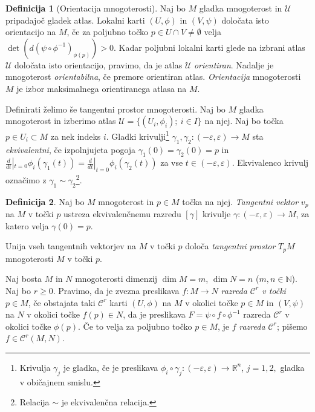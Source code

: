 \documentclass[12pt,a4paper,twoside]{article}
\theoremstyle{definition} %
\newtheorem{definicija}{Definicija}[section]
\theoremstyle{plain} %
\numberwithin{equation}{section}  %
\newcommand{\N}{\mathbb N}
\begin{document}
\begin{definicija}[Orientacija mnogoterosti]
Naj bo $M$ gladka mnogoterost in $\mathcal{U}$ pripadajoč gladek atlas. Lokalni karti $(U, \phi)$ in $(V, \psi)$ določata isto orientacijo na $M$, če za poljubno točko $p \in U \cap V \neq \emptyset$ velja $\det (d(\psi \circ \phi ^{-1})_{\phi (p)}) > 0.$ Kadar poljubni lokalni karti glede na izbrani atlas $\mathcal{U}$ določata isto orientacijo, pravimo, da je atlas $\mathcal{U}$ \emph{orientiran}. Nadalje je mnogoterost \emph{orientabilna}, če premore orientiran atlas. \emph{Orientacija} mnogoterosti $M$ je izbor maksimalnega orientiranega atlasa na $M$.
\end{definicija}

Definirati želimo še tangentni prostor mnogoterosti. Naj bo $M$ gladka mnogoterost in izberimo atlas $\mathcal{U} = \{ (U_{i}, \phi_{i}) ; \ i \in I \}$ na njej. Naj bo točka $p \in U_{i} \subset M$ za nek indeks $i$.  Gladki krivulji\footnote{Krivulja $\gamma_{j}$ je gladka, če je preslikava $ \phi_{i} \circ \gamma_{j} \colon (-\varepsilon, \varepsilon) \to \mathbb{R}^{n}$, $j=1,2,$ gladka v običajnem smislu.} 
$\gamma_{1}, \gamma_{2} \colon (-\varepsilon, \varepsilon) \to M$ sta \emph{ekvivalentni}, če izpolnjujeta pogoja
$\gamma_{1}(0) = \gamma_{2}(0) = p$ in $ \frac{d}{dt}|_{t=0} \phi_{i}(\gamma_{1}(t)) =  \frac{d}{dt}|_{t=0} \phi_{i}(\gamma_{2}(t))$ za vse $t \in (-\varepsilon, \varepsilon)$. Ekvivalenco krivulj označimo z $\gamma_{1} \sim \gamma_{2}$\footnote{Relacija $\sim$ je ekvivalenčna relacija.}.

\begin{definicija}
Naj bo $M$ mnogoterost in $p \in M$ točka na njej. \emph{Tangentni vektor} $v_{p}$ na $M$ v točki $p$ ustreza ekvivalenčnemu razredu $[\gamma]$ krivulje $\gamma \colon (-\varepsilon, \varepsilon) \to M$, za katero velja $\gamma (0) = p$.

Unija vseh tangentnih vektorjev na $M$ v točki $p$ določa \emph{tangentni prostor} $T_{p}M$ mnogoterosti $M$ v točki $p$.
\end{definicija}

Naj bosta $M$ in $N$ mnogoterosti dimenzij $\dim M = m$, $\dim N = n$ ($m, n \in \N$). Naj bo $r \geq 0$. Pravimo, da je zvezna preslikava $f \colon M \to N$ \emph{razreda $\mathcal{C}^{r}$ v točki} $p \in M$, če obstajata taki $\mathcal{C}^{r}$ karti $(U, \phi)$ na $M$ v okolici točke $p \in M$ in $(V, \psi)$ na $N$ v okolici točke $f(p) \in N$, da je preslikava $F = \psi \circ f \circ \phi^{-1}$ razreda $\mathcal{C}^{r}$ v okolici točke $\phi(p)$.
Če to velja za poljubno točko $p \in M$, je $f$ \emph{razreda $\mathcal{C}^{r}$}; pišemo $f \in  \mathcal{C}^{r}(M,N)$.
\end{document}
